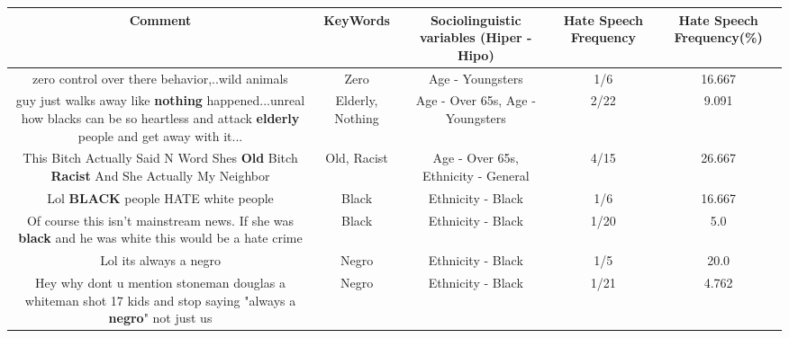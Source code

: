 \documentclass[11pt]{article}
\newlength\mylength
\begin{document}
\begin{center}
\setlength\mylength{\dimexpr\textwidth - 1\arrayrulewidth - 50\tabcolsep}
\begin{longtable}{|C{.65\mylength}|C{.30\mylength}|C{.12\mylength}|C{.12\mylength}|C{.12\mylength}|}
\hline
\textbf{Comment} & \textbf{KeyWords} & \textbf{Sociolinguistic variables (Hiper - Hipo)}  & \textbf{Hate Speech Frequency} & \textbf{Hate Speech Frequency(\%)} \\
\hline{}\small zero control over there behavior,..wild animals\normalsize   & Zero & Age - Youngsters & 1/6 & 16.667 \\  \hline
  \small guy just walks away like \textbf{nothing} happened...unreal how blacks can be so heartless and attack \textbf{elderly} people and get away with it...\normalsize   & Elderly, Nothing & Age - Over 65s, Age - Youngsters & 2/22 & 9.091 \\  \hline
  \small This Bitch Actually Said N Word Shes \textbf{Old} Bitch \textbf{Racist} And She Actually My Neighbor\normalsize   & Old, Racist & Age - Over 65s, Ethnicity - General & 4/15 & 26.667 \\  \hline
  \small Lol \textbf{BLACK} people HATE white people\normalsize   & Black & Ethnicity - Black & 1/6 & 16.667 \\  \hline
  \small Of course this isn't mainstream news. If she was \textbf{black} and he was white this would be a hate crime\normalsize   & Black & Ethnicity - Black & 1/20 & 5.0 \\  \hline
  \small Lol its always a negro\normalsize   & Negro & Ethnicity - Black & 1/5 & 20.0 \\  \hline
  \small Hey why dont u mention stoneman douglas a whiteman shot 17 kids and stop saying "always a \textbf{negro}" not just us\normalsize   & Negro & Ethnicity - Black & 1/21 & 4.762 \\  \hline

\end{longtable}
\end{center}
\end{document}
